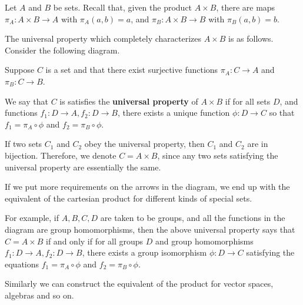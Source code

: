 \begin{example}
Let $A$ and $B$ be sets. Recall that, given the product $A\times B$, there are maps $\pi_A : A\times B \to A$ with $\pi_A(a,b)=a$, and $\pi_B : A\times B \to B$ with $\pi_B(a,b) =b$.

The universal property which completely characterizes $A\times B$ is as follows. Consider the following diagram.
\begin{center}
\end{center}

Suppose $C$ is a set and that there exist surjective functions $\pi_A : C\to A$ and $\pi_B : C \to B$.  

We say that $C$ is satisfies the \textbf{universal property} of $A\times B$ if for all sets $D$, and functions $f_1 : D\to A, f_2 : D \to B$, there exists a unique function $\phi : D \to C$ so that $f_1 = \pi_A\circ \phi$ and $f_2 = \pi_B \circ \phi$.

If two sets $C_1$ and $C_2$ obey the universal property, then $C_1$ and $C_2$ are in bijection. Therefore, we denote $C = A\times B$, since any two sets satisfying the universal property are essentially the same.

If we put more requirements on the arrows in the diagram, we end up with the equivalent of the cartesian product for different kinds of special sets.

For example, if $A,B,C,D$ are taken to be groups, and all the functions in the diagram are group homomorphisms, then the above universal property says that $C = A\times B$ if and only if for all groups $D$ and group homomorphisms $f_1:D\to A,f_2:D\to B$, there exists a group isomorphism $\phi : D \to C$ satisfying the equations $f_1 = \pi_A\circ\phi$ and $f_2=\pi_B\circ\phi$. 

Similarly we can construct the equivalent of the product for vector spaces, algebras and so on.
\end{example}

